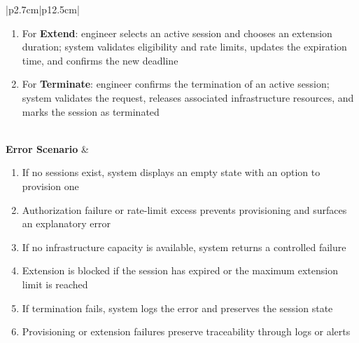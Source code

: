 \begin{table}[H]
\begin{tabular}{|p{2.7cm}|p{12.5cm}|}
\begin{minipage}[t]{\linewidth}
\begin{enumerate}[topsep=0pt,itemsep=1pt,parsep=0pt,partopsep=0pt]
                                              \item For \textbf{Extend}: engineer selects an active session and chooses an
                                                    extension duration; system validates eligibility and rate limits, updates the
                                                    expiration time, and confirms the new deadline
                                              \item For \textbf{Terminate}: engineer confirms the termination of an active session;
                                                    system validates the request, releases associated infrastructure resources, and
                                                    marks the session as terminated
                                          \end{enumerate}
                                      \end{minipage}                                          \\
            \hline
            \textbf{Error Scenario} & \begin{minipage}[t]{\linewidth}
                                          \begin{enumerate}[topsep=0pt,itemsep=1pt,parsep=0pt,partopsep=0pt]
                                              \item If no sessions exist, system displays an empty state with an option to
                                                    provision one
                                              \item Authorization failure or rate-limit excess prevents provisioning and surfaces
                                                    an explanatory error
                                              \item If no infrastructure capacity is available, system returns a controlled failure
                                              \item Extension is blocked if the session has expired or the maximum extension limit
                                                    is reached
                                              \item If termination fails, system logs the error and preserves the session state
                                              \item Provisioning or extension failures preserve traceability through logs or alerts
                                          \end{enumerate}
                                      \end{minipage}                                          \\
            \hline
        \end{tabular}
        \label{tab:eng-manage-sessions}
    \end{table}
